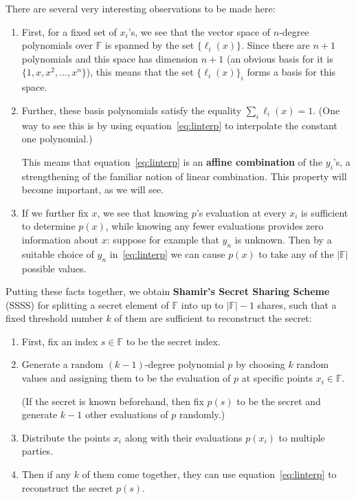 \documentclass[letterpaper]{article}
\begin{document}
There are several very interesting observations to be made here:
\begin{enumerate}
\item First, for a fixed set of $x_i$'s, we see that the vector space of
$n$-degree polynomials over $\mathbb{F}$ is spanned by the set $\{\ell_i(x)\}$. Since
there are $n+1$ polynomials and this space has dimension $n+1$ (an obvious
basis for it is $\{ 1,x,x^2,\ldots,x^n\}$), this means that the set
$\{\ell_i(x)\}_i$ forms a basis for this space.
\item Further, these basis polynomials satisfy the equality
$\sum_i \ell_i(x) = 1$. (One way to see this is by using
equation~\eqref{eq:linterp} to interpolate the constant one polynomial.)

This means that equation~\eqref{eq:linterp} is an \textbf{affine
combination} of the $y_i$'s, a strengthening of the familiar notion
of linear combination. This property will become important, as we
will see.
\item If we further fix $x$, we see that knowing $p$'s evaluation at
every $x_i$ is sufficient to determine $p(x)$, while knowing any fewer
evaluations provides zero information about $x$: suppose for example
that $y_n$ is unknown. Then by a suitable choice of $y_n$ in~\eqref{eq:linterp}
we can cause $p(x)$ to take any of the $|\mathbb{F}|$ possible values.
\end{enumerate}

Putting these facts together, we obtain \textbf{Shamir's Secret Sharing
Scheme} (SSSS) for splitting a secret element of $\mathbb{F}$ into up to $|\mathbb{F}|-1$
shares, such that a fixed threshold number $k$ of them are sufficient
to reconstruct the secret:

\begin{enumerate}
\item First, fix an index $s\in \mathbb{F}$ to be the secret index.
\item Generate a random $(k-1)$-degree polynomial $p$ by choosing $k$
random values and assigning them to be the evaluation of $p$ at specific
points $x_i\in \mathbb{F}$.

(If the secret is known beforehand, then fix $p(s)$ to be the secret
and generate $k-1$ other evaluations of $p$ randomly.)
\item Distribute the points $x_i$ along with their evaluations $p(x_i)$
to multiple parties.
\item Then if any $k$ of them come together, they can use equation~\eqref{eq:linterp}
to reconstruct the secret $p(s)$.
\end{enumerate}
\end{document}
